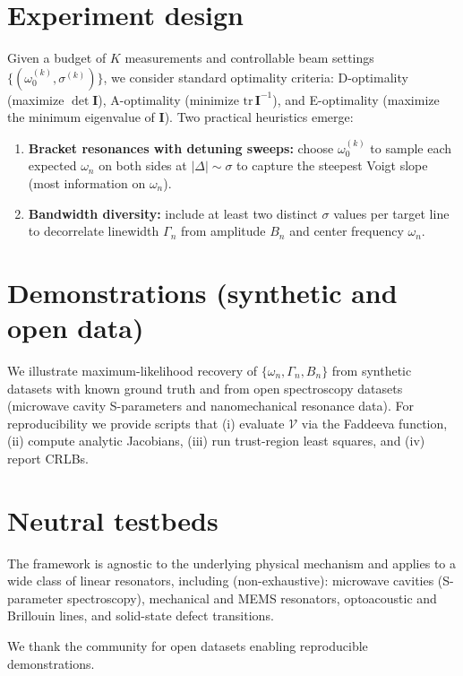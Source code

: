 \documentclass[aps,prb,amsmath,amssymb]{revtex4-2} %
\begin{document}
    \section{Experiment design}
        Given a budget of $K$ measurements and controllable beam settings $\{(\omega_0^{(k)},\sigma^{(k)})\}$,
        we consider standard optimality criteria: D-optimality (maximize $\det \mathbf{I}$),
        A-optimality (minimize $\mathrm{tr}\,\mathbf{I}^{-1}$), and E-optimality (maximize the minimum eigenvalue of $\mathbf{I}$).
        Two practical heuristics emerge:
        \begin{enumerate}
            \item \textbf{Bracket resonances with detuning sweeps:} choose $\omega_0^{(k)}$ to sample each expected $\omega_n$
            on both sides at $|\Delta|\sim\sigma$ to capture the steepest Voigt slope (most information on $\omega_n$).
            \item \textbf{Bandwidth diversity:} include at least two distinct $\sigma$ values per target line to decorrelate
            linewidth $\Gamma_n$ from amplitude $B_n$ and center frequency $\omega_n$.
        \end{enumerate}

    \section{Demonstrations (synthetic and open data)}
        We illustrate maximum-likelihood recovery of $\{\omega_n,\Gamma_n,B_n\}$ from synthetic datasets with known ground truth and
        from open spectroscopy datasets (microwave cavity S-parameters and nanomechanical resonance data).
        For reproducibility we provide scripts that (i) evaluate $\mathcal{V}$ via the Faddeeva function,
        (ii) compute analytic Jacobians, (iii) run trust-region least squares, and (iv) report CRLBs.

    \section{Neutral testbeds}
        The framework is agnostic to the underlying physical mechanism and applies to a wide class of linear resonators,
        including (non-exhaustive): microwave cavities (S-parameter spectroscopy), mechanical and MEMS resonators,
        optoacoustic and Brillouin lines, and solid-state defect transitions.


        \begin{acknowledgments}
            We thank the community for open datasets enabling reproducible demonstrations.
        \end{acknowledgments}
\end{document}
